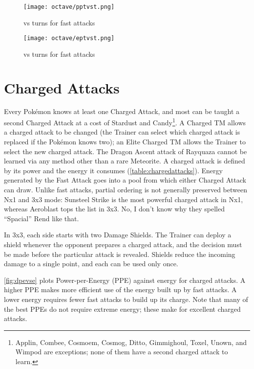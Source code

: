 \begin{figure}[ht]
\texttt{[image: octave/pptvst.png]}
  \caption{\PPT{} vs turns for fast attacks\label{fig:pptvst}}
\end{figure}

\begin{figure}[hb]
\texttt{[image: octave/eptvst.png]}
  \caption{\EPT{} vs turns for fast attacks\label{fig:eptvst}}
\end{figure}

\section{Charged Attacks\label{sec:charged}}
Every Pokémon knows at least one Charged Attack, and most can be taught a second
  Charged Attack at a cost of Stardust and Candy\footnote{Applin, Combee,
  Cosmoem, Cosmog, Ditto, Gimmighoul, Toxel, Unown, and Wimpod are exceptions;
  none of them have a second charged attack to learn.}.
A Charged TM allows a charged attack to be changed (the Trainer can select
  which charged attack is replaced if the Pokémon knows two);
  an Elite Charged TM allows the Trainer to select the new charged attack.
The Dragon Ascent attack of Rayquaza cannot be learned via any method other
  than a rare Meteorite.
A charged attack is defined by its power and the energy it consumes (\autoref{table:chargedattacks}).
Energy generated by the Fast Attack goes into a pool from which either Charged Attack can draw.
Unlike fast attacks, partial ordering is not generally preserved between Nx1 and 3x3 mode:
  Sunsteel Strike is the most powerful charged attack in Nx1, whereas Aeroblast tops
  the list in 3x3.
No, I don't know why they spelled ``Spacial'' Rend like that.


In 3x3, each side starts with two Damage Shields.
The Trainer can deploy a shield whenever the opponent prepares a charged attack,
   and the decision must be made before the particular attack is revealed.
Shields reduce the incoming damage to a single point, and each can be used only once.

\autoref{fig:dpevse} plots Power-per-Energy (PPE) against energy for charged attacks.
A higher PPE makes more efficient use of the energy built up by fast attacks.
A lower energy requires fewer fast attacks to build up its charge.
Note that many of the best PPEs do not require extreme energy; these make
 for excellent charged attacks.

